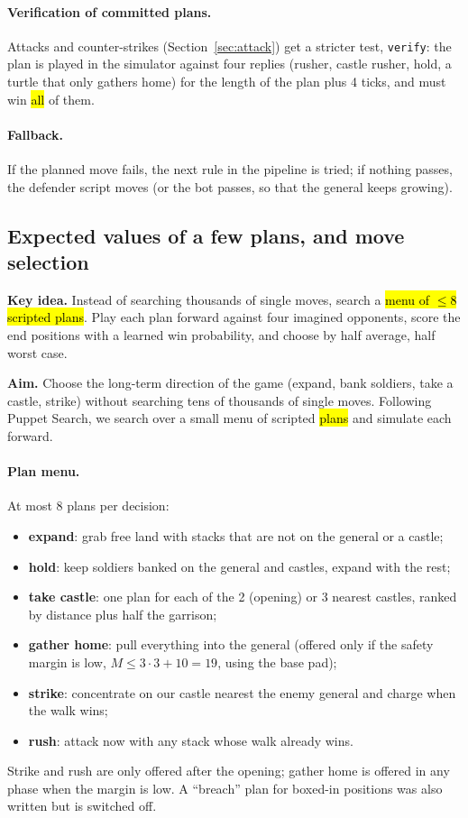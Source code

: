 \paragraph{Verification of committed plans.} Attacks and counter-strikes (Section~\ref{sec:attack}) get a
stricter test, \texttt{verify}: the plan is played in the simulator against four replies (rusher, castle
rusher, hold, a turtle that only gathers home) for the length of the plan plus 4 ticks, and must win
\hl{all} of them.

\paragraph{Fallback.} If the planned move fails, the next rule in the pipeline is tried; if nothing passes,
the defender script moves (or the bot passes, so that the general keeps growing).

\subsection{Expected values of a few plans, and move selection}\label{sec:plans}

\begin{keyidea}
\textbf{Key idea.} Instead of searching thousands of single moves, search a \hl{menu of $\le 8$ scripted
plans}. Play each plan forward against four imagined opponents, score the end positions with a learned win
probability, and choose by half average, half worst case.
\end{keyidea}

\textbf{Aim.} Choose the long-term direction of the game (expand, bank soldiers, take a castle, strike)
without searching tens of thousands of single moves. Following Puppet Search, we search over a small menu of
scripted \hl{plans} and simulate each forward.

\paragraph{Plan menu.} At most 8 plans per decision:
\begin{itemize}
\item \textbf{expand}: grab free land with stacks that are not on the general or a castle;
\item \textbf{hold}: keep soldiers banked on the general and castles, expand with the rest;
\item \textbf{take castle}: one plan for each of the 2 (opening) or 3 nearest castles, ranked by distance plus
half the garrison;
\item \textbf{gather home}: pull everything into the general (offered only if the safety margin is low,
$M\le 3\cdot 3+10=19$, using the base pad);
\item \textbf{strike}: concentrate on our castle nearest the enemy general and charge when the walk wins;
\item \textbf{rush}: attack now with any stack whose walk already wins.
\end{itemize}
Strike and rush are only offered after the opening; gather home is offered in any phase when the margin is
low. A ``breach'' plan for boxed-in positions was also written but is switched off.

